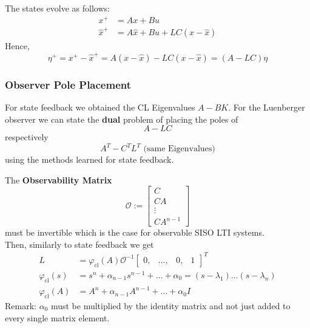 The states evolve as follows:
\begin{align*}
    x^+       & =Ax+Bu                     \\
    \hat{x}^+ & =A\hat{x}+Bu+LC(x-\hat{x})
\end{align*}
Hence,
\begin{equation*}
    \eta^+=x^+-\hat{x}^+=A(x-\hat{x})-LC(x-\hat{x})=(A-LC)\eta
\end{equation*}

\subsubsection{Observer Pole Placement}
For state feedback we obtained the CL Eigenvalues $A-BK$. For the Luenberger observer we can state the \textbf{dual} problem of placing the poles of
\begin{equation*}
    A-LC
\end{equation*}
respectively
\begin{equation*}
    A^T-C^T L^T\text{ (same Eigenvalues)}
\end{equation*}
using the methods learned for state feedback.


The \textbf{Observability Matrix}
\begin{equation*}
    \mathcal{O}:=\begin{bmatrix}C\\CA\\\vdots\\CA^{n-1}\end{bmatrix}
\end{equation*}
must be invertible which is the case for observable SISO LTI systems.\\
Then, similarly to state feedback we get
\begin{align*}
    L                        & =\varphi_{\mathrm{cl}}(A)\mathcal{O}^{-1}\begin{bmatrix}0,&\ldots,&0,&1\end{bmatrix}^T \\
    \varphi_{\mathrm{cl}}(s) & =s^n+\alpha_{n-1}s^{n-1}+\ldots+\alpha_0=(s-\lambda_1)\ldots(s-\lambda_n)              \\
    \varphi_{\mathrm{cl}}(A) & =A^n+\alpha_{n-1}A^{n-1}+\ldots+\alpha_0I
\end{align*}
Remark: $\alpha_0$ must be multiplied by the identity matrix and not just added to every single matrix element.


